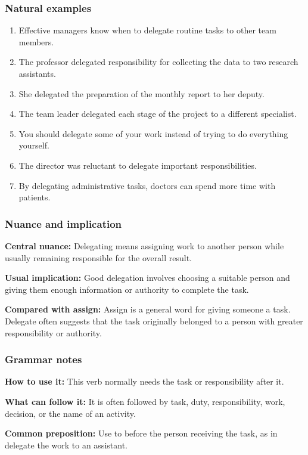 \documentclass[11pt]{article}
\begin{document}
\subsubsection{Natural examples}
\begin{enumerate}
  \item Effective managers know when to delegate routine tasks to other team members.
  \item The professor delegated responsibility for collecting the data to two research assistants.
  \item She delegated the preparation of the monthly report to her deputy.
  \item The team leader delegated each stage of the project to a different specialist.
  \item You should delegate some of your work instead of trying to do everything yourself.
  \item The director was reluctant to delegate important responsibilities.
  \item By delegating administrative tasks, doctors can spend more time with patients.
\end{enumerate}

\subsubsection{Nuance and implication}
\textbf{Central nuance:} Delegating means assigning work to another person while usually remaining responsible for the overall result.

\textbf{Usual implication:} Good delegation involves choosing a suitable person and giving them enough information or authority to complete the task.

\textbf{Compared with assign:} Assign is a general word for giving someone a task. Delegate often suggests that the task originally belonged to a person with greater responsibility or authority.

\subsubsection{Grammar notes}
\textbf{How to use it:} This verb normally needs the task or responsibility after it.

\textbf{What can follow it:} It is often followed by task, duty, responsibility, work, decision, or the name of an activity.

\textbf{Common preposition:} Use to before the person receiving the task, as in delegate the work to an assistant.
\end{document}

